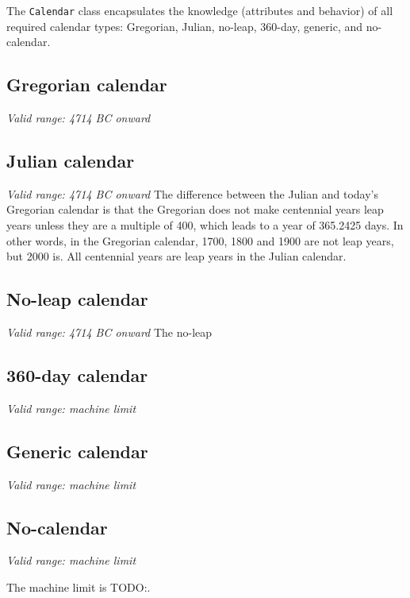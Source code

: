 
The {\tt Calendar} class encapsulates the knowledge (attributes and
behavior) of all required calendar types:  Gregorian, Julian, no-leap,
360-day, generic, and no-calendar.
            
\subsection{Gregorian calendar}
{\it Valid range: 4714 BC onward}

\subsection{Julian calendar} 
{\it Valid range: 4714 BC onward}
The difference between the Julian and today's Gregorian calendar is that 
the Gregorian does not make centennial years leap years unless they are 
a multiple of 400, which leads to a year of 365.2425 days. In other words, 
in the Gregorian calendar, 1700, 1800 and 1900 are not leap years, but 
2000 is. All centennial years are leap years in the Julian calendar. 

\subsection{No-leap calendar}
{\it Valid range: 4714 BC onward}
The no-leap 

\subsection{360-day calendar}
{\it Valid range: machine limit}

\subsection{Generic calendar}
{\it Valid range: machine limit}
 
\subsection{No-calendar}
{\it Valid range: machine limit}

The machine limit is TODO:.




